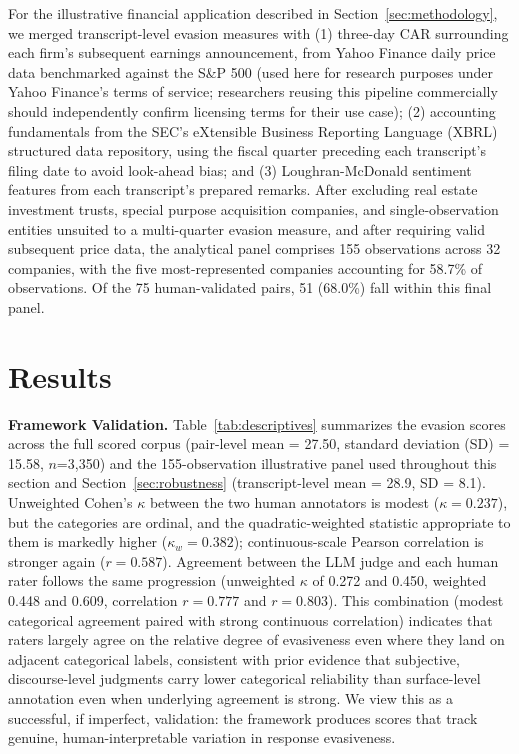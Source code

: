 \documentclass[conference]{IEEEtran}
\begin{document}
For the illustrative financial application described in Section~\ref{sec:methodology}, we merged transcript-level evasion measures with (1) three-day CAR surrounding each firm's subsequent earnings announcement, from Yahoo Finance daily price data benchmarked against the S\&P 500 (used here for research purposes under Yahoo Finance's terms of service; researchers reusing this pipeline commercially should independently confirm licensing terms for their use case); (2) accounting fundamentals from the SEC's eXtensible Business Reporting Language (XBRL) structured data repository, using the fiscal quarter preceding each transcript's filing date to avoid look-ahead bias; and (3) Loughran-McDonald sentiment features from each transcript's prepared remarks. After excluding real estate investment trusts, special purpose acquisition companies, and single-observation entities unsuited to a multi-quarter evasion measure, and after requiring valid subsequent price data, the analytical panel comprises 155 observations across 32 companies, with the five most-represented companies accounting for 58.7\% of observations. Of the 75 human-validated pairs, 51 (68.0\%) fall within this final panel.

\section{Results}
\label{sec:results}

\textbf{Framework Validation.} Table~\ref{tab:descriptives} summarizes the evasion scores across the full scored corpus (pair-level mean = 27.50, standard deviation (SD) = 15.58, $n$=3,350) and the 155-observation illustrative panel used throughout this section and Section~\ref{sec:robustness} (transcript-level mean = 28.9, SD = 8.1). Unweighted Cohen's $\kappa$ between the two human annotators is modest ($\kappa = 0.237$), but the categories are ordinal, and the quadratic-weighted statistic appropriate to them is markedly higher ($\kappa_w = 0.382$); continuous-scale Pearson correlation is stronger again ($r = 0.587$). Agreement between the LLM judge and each human rater follows the same progression (unweighted $\kappa$ of 0.272 and 0.450, weighted 0.448 and 0.609, correlation $r = 0.777$ and $r = 0.803$). This combination (modest categorical agreement paired with strong continuous correlation) indicates that raters largely agree on the relative degree of evasiveness even where they land on adjacent categorical labels, consistent with prior evidence that subjective, discourse-level judgments carry lower categorical reliability than surface-level annotation even when underlying agreement is strong. We view this as a successful, if imperfect, validation: the framework produces scores that track genuine, human-interpretable variation in response evasiveness.
\end{document}
